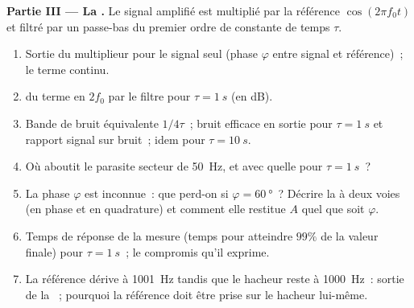 \begin{problem}
\medskip
\noindent\textbf{Partie III --- La .}
Le signal amplifié est multiplié par la référence $\cos(2\pi f_0t)$
et filtré par un passe-bas du premier ordre de constante de temps $\tau$.
\begin{enumerate}[resume]
  \item Sortie du multiplieur pour le signal seul (phase $\varphi$
        entre signal et référence)~; le terme continu.
  \item {} du terme en $2f_0$ par le filtre pour $\tau = \qty{1}{s}$
        (en dB).
  \item Bande de bruit équivalente $1/4\tau$~; bruit efficace en sortie
        pour $\tau = \qty{1}{s}$ et rapport signal sur bruit~; idem pour $\tau = \qty{10}{s}$.
  \item Où aboutit le parasite secteur de \qty{50}{Hz}, et avec quelle
         pour $\tau = \qty{1}{s}$~?
  \item La phase $\varphi$ est inconnue~: que perd-on si $\varphi = \qty{60}{\degree}$~?
        Décrire la  à deux voies (en phase et en quadrature) et
        comment elle restitue $A$ quel que soit $\varphi$.
  \item Temps de réponse de la mesure (temps pour atteindre $99\%$ de la
        valeur finale) pour $\tau = \qty{1}{s}$~; le compromis qu'il exprime.
  \item La référence dérive à \qty{1001}{Hz} tandis que le hacheur reste à
        \qty{1000}{Hz}~: sortie de la ~; pourquoi la référence doit être
        prise sur le hacheur lui-même.
\end{enumerate}


\end{problem}
